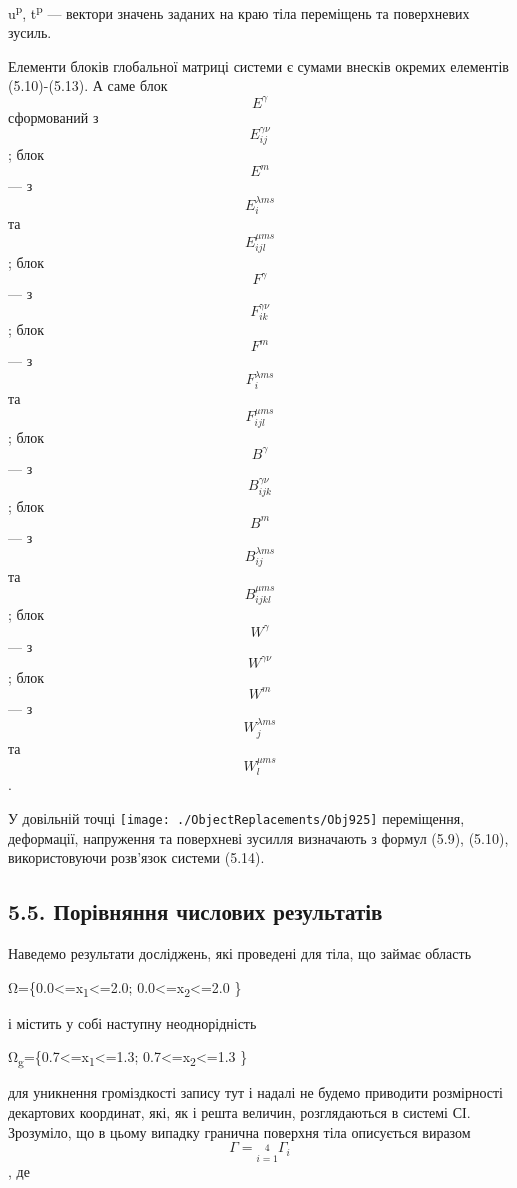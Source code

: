 u\textsuperscript{p}, t\textsuperscript{p} --- вектори значень заданих
на краю тіла переміщень та поверхневих зусиль.

Елементи блоків глобальної матриці системи є сумами внесків окремих
елементів (5.10)-(5.13). А саме блок \[E^{\gamma}{}\] сформований з
\[E_{\mathit{\text{ij}}}^{\mathit{\text{γν}}}{}\]; блок \[E^{m}{}\] ---
з \[E_{i}^{\lambda\mathit{\text{ms}}}{}\] та
\[E_{\mathit{\text{ijl}}}^{\mu\mathit{\text{ms}}}{}\]; блок
\[F^{\gamma}{}\] --- з
\[F_{\mathit{\text{ik}}}^{\mathit{\text{γν}}}{}\]; блок \[F^{m}{}\] ---
з \[F_{i}^{\lambda\mathit{\text{ms}}}{}\] та
\[F_{\mathit{\text{ijl}}}^{\mu\mathit{\text{ms}}}{}\]; блок
\[B^{\gamma}{}\]--- з
\[B_{\mathit{\text{ijk}}}^{\mathit{\text{γν}}}{}\]; блок \[B^{m}{}\] ---
з \[B_{\mathit{\text{ij}}}^{\lambda\mathit{\text{ms}}}{}\] та
\[B_{\mathit{\text{ijkl}}}^{\mu\mathit{\text{ms}}}{}\]; блок
\[W^{\gamma}{}\]--- з \[W^{\mathit{\text{γν}}}{}\]; блок \[W^{m}{}\] ---
з \[W_{j}^{\lambda\mathit{\text{ms}}}{}\] та
\[W_{l}^{\mu\mathit{\text{ms}}}{}\].

У довільній точці
\texttt{[image: ./ObjectReplacements/Obj925]}
переміщення, деформації, напруження та поверх­неві зусилля визначають з
формул (5.9), (5.10), використовуючи розв'язок системи (5.14).

\hypertarget{ux43fux43eux440ux456ux432ux43dux44fux43dux43dux44f-ux447ux438ux441ux43bux43eux432ux438ux445-ux440ux435ux437ux443ux43bux44cux442ux430ux442ux456ux432-1}{%
\subsection[5.5. Порівняння числових
результатів]{\texorpdfstring{\protect\hypertarget{anchor-65}{}{}5.5.
Порівняння числових
результатів}{5.5. Порівняння числових результатів}}\label{ux43fux43eux440ux456ux432ux43dux44fux43dux43dux44f-ux447ux438ux441ux43bux43eux432ux438ux445-ux440ux435ux437ux443ux43bux44cux442ux430ux442ux456ux432-1}}

Наведемо результати досліджень, які проведені для тіла, що займає
область

Ω=\{0.0\textless=x\textsubscript{1}\textless=2.0;
0.0\textless=x\textsubscript{2}\textless=2.0 \}

і містить у собі наступну неоднорідність

Ω\textsubscript{g}=\{0.7\textless=x\textsubscript{1}\textless=1.3;
0.7\textless=x\textsubscript{2}\textless=1.3 \}

для уникнення громіздкості запису тут і надалі не будемо приводити
розмірності декартових координат, які, як і решта величин, розглядаються
в системі СІ. Зрозуміло, що в цьому випадку гранична поверхня тіла
описується виразом
\[{{\Gamma = \underset{i = 1}{\overset{4}{}}}\Gamma_{i}}{}\] , де

